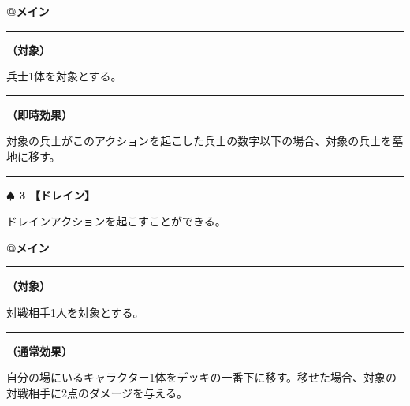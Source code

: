 \documentclass[twocolumn,a5paper,papersize,10pt]{jarticle}
\begin{document}
\begin{tcolorbox}[title={\small\bf【Action】スラッシュ}{\scriptsize （兵士起因）}]

{\scriptsize\bf @メイン }

\vspace{1mm} %
\hrule height 0.1mm depth 0mm width 62mm %
\vspace{1mm} %

{\bf（対象）}

兵士1体を対象とする。

\vspace{1mm} %
\hrule height 0.1mm depth 0mm width 62mm %
\vspace{1mm} %

{\bf（即時効果）}

対象の兵士がこのアクションを起こした兵士の数字以下の場合、対象の兵士を墓地に移す。

\vspace{1mm} %
\end{tcolorbox}

\vspace{-1zh}
  
 

\vspace{3mm} %
\hrule height 0.5mm depth 0mm width 66.5mm %
\vspace{1mm} %
{\Large\bf $\spadesuit$ 3} {\normalsize\bf【ドレイン】} %
\vspace{1mm} %

ドレインアクションを起こすことができる。

\begin{tcolorbox}[title={\small\bf【Action】ドレイン}{\scriptsize （通常魔法）}]

{\scriptsize\bf @メイン }

\vspace{1mm} %
\hrule height 0.1mm depth 0mm width 62mm %
\vspace{1mm} %

{\bf（対象）}

対戦相手1人を対象とする。

\vspace{1mm} %
\hrule height 0.1mm depth 0mm width 62mm %
\vspace{1mm} %

{\bf（通常効果）}

自分の場にいるキャラクター1体をデッキの一番下に移す。移せた場合、対象の対戦相手に2点のダメージを与える。

\vspace{1mm} %
\end{tcolorbox}
\end{document}
